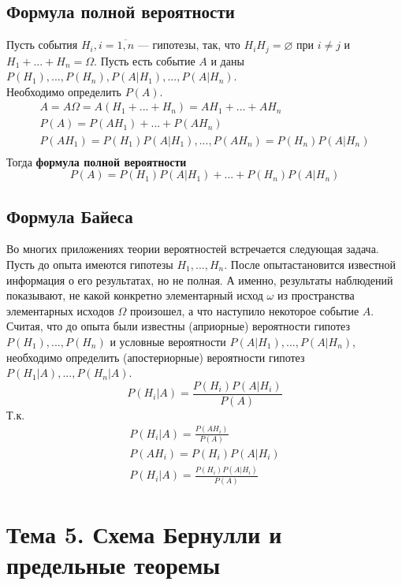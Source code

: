 \documentclass[12pt]{article}
\begin{document}
\subsection{Формула полной вероятности}
Пусть события $H_i, i=\overline{1, n}$ --- гипотезы, так, что $H_iH_j = \varnothing$ при $i \neq j$ и $H_1 + ... + H_n = \Omega$. Пусть есть событие $A$ и даны $P(H_1), ..., P(H_n), P(A|H_1), ..., P(A|H_n)$. \\
Необходимо определить $P(A)$. \\
\begin{gather*}
	A = A\Omega = A(H_1 + ... + H_n) = AH_1 + ... + AH_n \\
	P(A) = P(AH_1) + ... + P(AH_n) \\
	P(AH_1) = P(H_1)P(A|H_1), ..., P(AH_n) = P(H_n)P(A|H_n) \\
\end{gather*}
Тогда \textbf{формула полной вероятности}
\begin{equation*}
	P(A) = P(H_1)P(A|H_1) + ... + P(H_n)P(A|H_n)
\end{equation*}

\subsection{Формула Байеса}
Во многих приложениях теории вероятностей встречается следующая задача.
Пусть до опыта имеются гипотезы $H_1, ..., H_n$.
После опытастановится известной информация о его результатах, но не полная.
А именно, результаты наблюдений показывают, не какой конкретно элементарный исход $\omega$
из пространства элементарных исходов $\Omega$ произошел, а что наступило некоторое событие $A$.
Считая, что до опыта были известны (априорные) вероятности гипотез $P(H_1), ..., P(H_n)$
и условные вероятности $P(A|H_1), ..., P(A|H_n)$,
необходимо определить (апостериорные) вероятности гипотез $P(H_1|A), ..., P(H_n|A)$.
\[P(H_i|A) = \frac{P(H_i)P(A|H_i)}{P(A)}\]
Т.к.
\begin{gather*}
	P(H_i|A) = \frac{P(AH_i)}{P(A)} \\
	P(AH_i) = P(H_i)P(A|H_i) \\
	P(H_i|A) = \frac{P(H_i)P(A|H_i)}{P(A)}
\end{gather*}

\section{Тема 5. Схема Бернулли и предельные теоремы}
\end{document}
